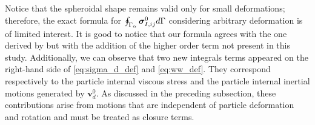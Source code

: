 Notice that the spheroidal shape remains valid only for small deformations; therefore, the exact formula for $\oint_{\Gamma_{\alpha}} \bm\sigma_{I,ij}^0 d\Gamma$ considering arbitrary deformation is of limited interest. 
It is good to notice that our formula agrees with the one derived by \citet{lhuillier1987phenomenology} but with the addition of the higher order term not present in this study. 
Additionally, we can observe that two new integrals terms appeared on the right-hand side of \ref{eq:sigma_d_def}  and \ref{eq:ww_def}. 
They correspond respectively to the particle internal viscous stress and the particle internal inertial motions generated by $\textbf{v}_d^0$.
As discussed in the preceding subsection, these contributions arise from motions that are independent of particle deformation and rotation and must be treated as closure terms. 



